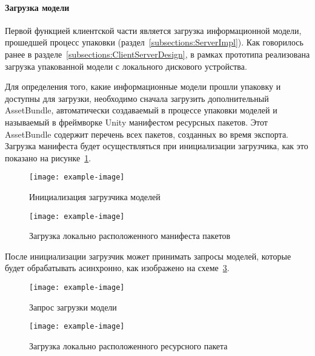 ﻿\paragraph{Загрузка модели}

Первой функцией клиентской части является загрузка информационной модели,
прошедшей процесс упаковки (раздел~\ref{subsections:ServerImpl}).
Как говорилось ранее в разделе~\ref{subsections:ClientServerDesign},
в рамках прототипа реализована загрузка упакованной модели
с локального дискового устройства.

Для определения того, какие информационные модели прошли упаковку
и доступны для загрузки, необходимо сначала загрузить дополнительный AssetBundle,
автоматически создаваемый в процессе упаковки моделей
и называемый в фреймворке Unity манифестом ресурсных пакетов.
Этот AssetBundle содержит перечень всех пакетов, созданных во время экспорта.%
\cite{DocUnity,UnityAssetsResourcesBundles}
Загрузка манифеста будет осуществляться при инициализации загрузчика,
как это показано на рисунке~\ref{figure:SInitModelLoader}.

\begin{figure}[ht]
    \centering
    \texttt{[image: example-image]}
    \caption{Инициализация загрузчика моделей}
    \label{figure:SInitModelLoader}
\end{figure}


\begin{figure}[ht]
    \centering
    \texttt{[image: example-image]}
    \caption{Загрузка локально расположенного манифеста пакетов}
    \label{figure:SLocalLoadManifestBundle}
\end{figure}

После инициализации загрузчик может принимать запросы моделей,
которые будет обрабатывать асинхронно, как изображено
на схеме~\ref{figure:SModelRequest}.

\begin{figure}[ht]
    \centering
    \texttt{[image: example-image]}
    \caption{Запрос загрузки модели}
    \label{figure:SModelRequest}
\end{figure}


\begin{figure}[ht]
    \centering
    \texttt{[image: example-image]}
    \caption{Загрузка локально расположенного ресурсного пакета}
    \label{figure:SLocalLoadBundle}
\end{figure}
